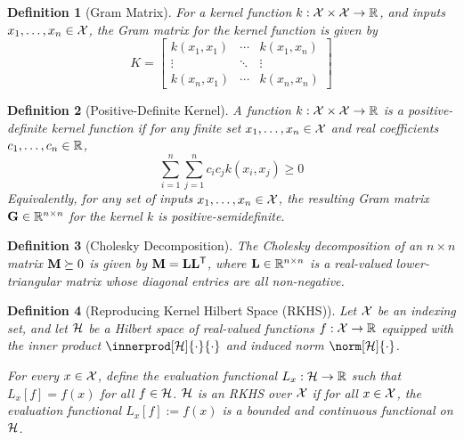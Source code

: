 \documentclass[10pt]{article}
\newtheorem{definition}{Definition}[section]
\numberwithin{equation}{section}
\begin{document}
\begin{definition}[Gram Matrix]
\label{def:gram-matrix}  
    For a kernel function $k: \mathcal{X} \times \mathcal{X} \to \mathbb{R}$, and inputs $x_{1}, \dots, x_{n} \in \mathcal{X}$, the Gram matrix for the kernel function is given by
    \begin{equation}
        K = \begin{bmatrix}
            k(x_{1}, x_{1}) & \cdots & k(x_{1}, x_{n})\\
            \vdots & \ddots & \vdots\\
            k(x_{n}, x_{1}) & \cdots & k(x_{n}, x_{n})
        \end{bmatrix}
    \end{equation}
\end{definition}

\begin{definition}[Positive-Definite Kernel]
\label{def:pos-def-kernel}
    A function $k: \mathcal{X} \times \mathcal{X} \to \mathbb{R}$ is a positive-definite kernel function if for any finite set $x_{1}, \dots, x_{n} \in \mathcal{X}$ and real coefficients $c_{1}, \dots, c_{n} \in \mathbb{R}$, 
    \begin{equation}
        \sum_{i=1}^{n}\sum_{j=1}^{n}c_{i}c_{j}k(x_{i}, x_{j}) \ge 0
    \end{equation}
    Equivalently, for any set of inputs $x_{1}, \dots, x_{n} \in \mathcal{X}$, the resulting Gram matrix $\mathbf{G} \in \mathbb{R}^{n \times n}$ for the kernel $k$ is positive-semidefinite.
\end{definition}

\begin{definition}[Cholesky Decomposition]
\label{def:cholesky}
    The Cholesky decomposition of an $n \times n$ matrix $\mathbf{M} \succeq 0$ is given by $\mathbf{M} = \mathbf{L}\mathbf{L}^{\scriptstyle{\mathsf{T}}}$, where $\mathbf{L} \in \mathbb{R}^{n \times n}$ is a real-valued lower-triangular matrix whose diagonal entries are all non-negative. 
\end{definition}

\begin{definition}[Reproducing Kernel Hilbert Space (RKHS)]
\label{def:rkhs}
    Let $\mathcal{X}$ be an indexing set, and let $\mathcal{H}$ be a Hilbert space of real-valued functions $f: \mathcal{X} \to \mathbb{R}$ equipped with the inner product $\innerprod[\calH]{\cdot}{\cdot}$ and induced norm $\norm[\calH]{\cdot}$. 
    
    For every $x \in \mathcal{X}$, define the evaluation functional $L_{x}: \mathcal{H} \to \mathbb{R}$ such that $L_{x}[f] = f(x)$ for all $f \in \mathcal{H}$. $\mathcal{H}$ is an RKHS over $\mathcal{X}$ if for all $x \in \mathcal{X}$, the evaluation functional $L_{x}[f] := f(x)$ is a bounded and continuous functional on $\mathcal{H}$. 
\end{definition}
\end{document}
